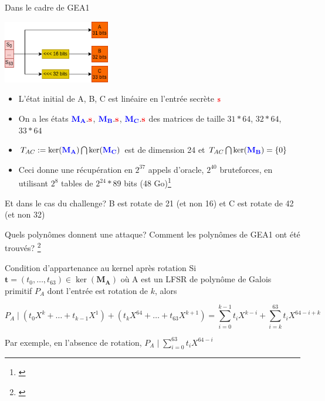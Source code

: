 \begin{frame}{Dans le cadre de GEA1}

\begin{center}                  
    \includegraphics[width=0.35\textwidth]{img/crypto/gea/zoom.png}
\end{center}

\begin{itemize}
    \item L'état initial de A, B, C est linéaire en l'entrée secrète $\textcolor{red}{\mathbf{s}}$
    
    \item On a les états $\textcolor{blue}{\mathbf{M_A}}.\textcolor{red}{\mathbf{s}}$, $\textcolor{blue}{\mathbf{M_B}}.\textcolor{red}{\mathbf{s}}$, $\textcolor{blue}{\mathbf{M_C}}.\textcolor{red}{\mathbf{s}}$ des matrices de taille $31*64$, $32*64$, $33*64$
    \pause

    \item $T_{AC} := \ker(\textcolor{blue}{\mathbf{M_A}}) \bigcap \ker(\textcolor{blue}{\mathbf{M_C}})$ est de dimension 24 et $T_{AC}\bigcap \ker(\textcolor{blue}{\mathbf{M_B}}) = \{0\}$

    \item Ceci donne une récupération en $2^{37}$ appels d'oracle, $2^{40}$ bruteforces, en utilisant $2^8$ tables de $2^{24}*89$ bits (48 Go)\footnote{\cite{cryptoeprint:2021/819}}
\end{itemize}
\end{frame}


\begin{frame}{Et dans le cas du challenge?}
B est rotate de 21 (et non 16) et C est rotate de 42 (et non 32) 
\begin{outline}
    \1 Quels polynômes donnent une attaque?
    \pause
    \1 Comment les polynômes de GEA1 ont été trouvés? \footnote{\cite{cryptoeprint:2021/829}}

        \pause 
        
    \begin{block}{Condition d'appartenance au kernel après rotation}
    Si $\mathbf{t}=(t_0,\dots,t_{63})\in\ker(\mathbf{M_A})$ où A est un LFSR de polynôme de Galois primitif $P_A$ dont l'entrée est rotation de $k$, alors

    \[P_A \;|\; \left(t_0X^{k}+\dots +t_{k-1}X^1\right) + \left(t_{k}X^{64} + \dots + t_{63}X^{k+1}\right) =\displaystyle\sum_{i=0}^{k-1} t_i X^{k-i} + \displaystyle\sum_{i=k}^{63} t_i X^{64-i+k}\]

    Par exemple, en l'absence de rotation, $P_A \;|\; \displaystyle\sum_{i=0}^{63} t_i X^{64-i}$
    \end{block}
\end{outline}
\end{frame}

